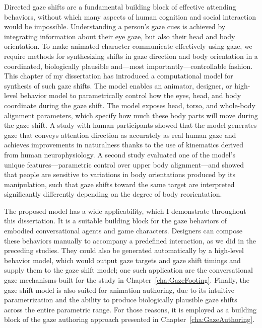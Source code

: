 Directed gaze shifts are a fundamental building block of effective attending behaviors, without which many aspects of human cognition and social interaction would be impossible. Understanding a person's gaze cues is achieved by integrating information about their eye gaze, but also their head and body orientation. To make animated character communicate effectively using gaze, we require methods for synthesizing shifts in gaze direction and body orientation in a coordinated, biologically plausible and---most importantly---controllable fashion. This chapter of my dissertation has introduced a computational model for synthesis of such gaze shifts. The model enables an animator, designer, or high-level behavior model to parametrically control how the eyes, head, and body coordinate during the gaze shift. The model exposes head, torso, and whole-body alignment parameters, which specify how much these body parts will move during the gaze shift. A study with human participants showed that the model generates gaze that conveys attention direction as accurately as real human gaze and achieves improvements in naturalness thanks to the use of kinematics derived from human neurophysiology. A second study evaluated one of the model's unique features---parametric control over upper body alignment---and showed that people are sensitive to variations in body orientations produced by its manipulation, such that gaze shifts toward the same target are interpreted significantly differently depending on the degree of body reorientation.

The proposed model has a wide applicability, which I demonstrate throughout this dissertation. It is a suitable building block for the gaze behaviors of embodied conversational agents and game characters. Designers can compose these behaviors manually to accompany a predefined interaction, as we did in the preceding studies. They could also be generated automatically by a high-level behavior model, which would output gaze targets and gaze shift timings and supply them to the gaze shift model; one such application are the conversational gaze mechanisms built for the study in Chapter~\ref{cha:GazeFooting}. Finally, the gaze shift model is also suited for animation authoring, due to its intuitive parametrization and the ability to produce biologically plausible gaze shifts across the entire parametric range. For those reasons, it is employed as a building block of the gaze authoring approach presented in Chapter~\ref{cha:GazeAuthoring}.

